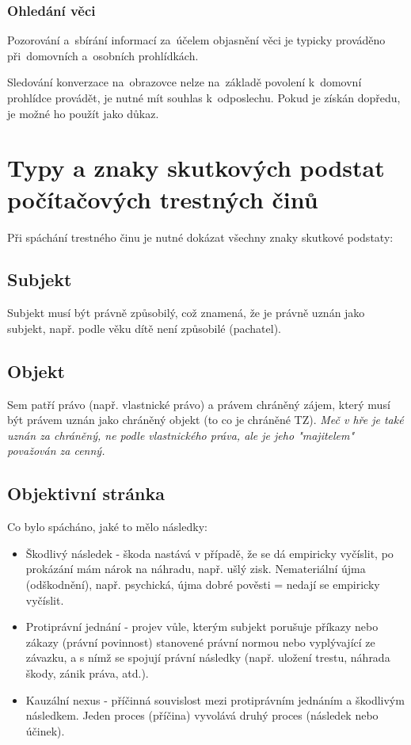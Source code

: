 \subsubsection{Ohledání věci}

Pozorování a~sbírání informací za~účelem objasnění věci je typicky prováděno při~domovních a~osobních prohlídkách.

Sledování konverzace na~obrazovce nelze na~základě povolení k~domovní prohlídce provádět, je nutné mít souhlas k~odposlechu.
Pokud je získán dopředu, je možné ho použít jako důkaz.


\clearpage
\section{Typy a znaky skutkových podstat počítačových trestných činů}

Při spáchání trestného činu je nutné dokázat všechny znaky skutkové podstaty:

\subsection*{Subjekt}
Subjekt musí být právně způsobilý, což znamená, že je právně uznán jako subjekt, např. podle věku dítě není způsobilé (pachatel).

\subsection*{Objekt}
Sem patří právo (např. vlastnické právo) a právem chráněný zájem, který musí být právem uznán jako chráněný objekt (to co je chráněné TZ). \textit{Meč v hře je také uznán za chráněný, ne podle vlastnického práva, ale je jeho "majitelem" považován za cenný.}

\subsection*{Objektivní stránka}
Co bylo spácháno, jaké to mělo následky:
\begin{itemize}
    \item Škodlivý následek - škoda nastává v případě, že se dá empiricky vyčíslit, po prokázání mám nárok na náhradu, např. ušlý zisk. Nemateriální újma (odškodnění), např. psychická, újma dobré pověsti = nedají se empiricky vyčíslit.
    \item Protiprávní jednání - projev vůle, kterým subjekt porušuje příkazy nebo zákazy (právní povinnost) stanovené právní normou nebo vyplývající ze závazku, a s nímž se spojují právní následky (např. uložení trestu, náhrada škody, zánik práva, atd.).
    \item Kauzální nexus - příčinná souvislost mezi protiprávním jednáním a škodlivým následkem. Jeden proces (příčina) vyvolává druhý proces (následek nebo účinek).
\end{itemize}

